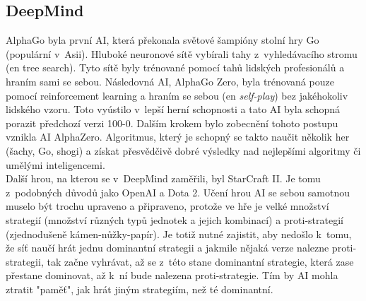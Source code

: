 \documentclass[12pt]{report}			%
\begin{document}
	\subsection{DeepMind}
	\label{sec:DeepMind}
	AlphaGo byla první \gls{AI}, která překonala světové šampióny stolní hry Go (populární v~Asii). Hluboké neuronové sítě vybírali tahy z~vyhledávacího stromu (\gls{en} tree search). Tyto sítě byly trénované pomocí tahů lidských profesionálů a hraním sami se sebou. Následovná \gls{AI}, AlphaGo Zero, byla trénovaná pouze pomocí reinforcement learning a hraním se sebou (\gls{en} \emph{self-play}) bez jakéhokoliv lidského vzoru. Toto vyústilo v~lepší herní schopnosti a tato \gls{AI} byla schopná porazit předchozí verzi 100-0. \parencite{AlphaGoZero} Dalším krokem bylo zobecnění tohoto postupu vznikla \gls{AI} AlphaZero. Algoritmus, který je schopný se takto naučit několik her (šachy, Go, shogi) a získat přesvědčivě dobré výsledky nad nejlepšími algoritmy či umělými inteligencemi.\parencite{AlphaZero}\\
	Další hrou, na kterou se v~DeepMind zaměřili, byl StarCraft II. Je tomu z~podobných důvodů jako OpenAI a Dota 2. Učení hrou \gls{AI} se sebou samotnou muselo být trochu upraveno a připraveno, protože ve hře je velké množství strategií (množství různých typů jednotek a jejich kombinací) a proti-strategií (zjednodušeně kámen-nůžky-papír). Je totiž nutné zajistit, aby nedošlo k~tomu, že síť naučí hrát jednu dominantní strategii a jakmile nějaká verze nalezne proti-strategii, tak začne vyhrávat, až se z~této stane dominantní strategie, která zase přestane dominovat, až k~ní bude nalezena proti-strategie. Tím by \gls{AI} mohla ztratit "paměť", jak hrát jiným strategiím, než té dominantní.\parencite{AlphaStar}
\end{document}

